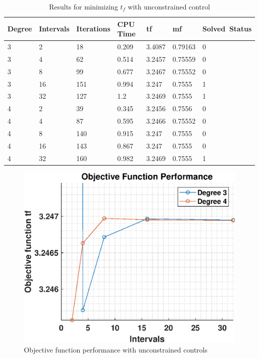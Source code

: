 \documentclass[]{article}
\begin{document}
	\begin{table}[h!]
   	\begin{tabular}{lllllll}
   		Degree & Intervals & Iterations & CPU Time & tf & mf & Solved\ Status \\ 
   		\hline 
   		3 & 2 & 18 & 0.209 & 3.4087 & 0.79163 & 0 \\ 
   		3 & 4 & 62 & 0.514 & 3.2457 & 0.75559 & 0 \\ 
   		3 & 8 & 99 & 0.677 & 3.2467 & 0.75552 & 0 \\ 
   		3 & 16 & 151 & 0.994 & 3.247 & 0.7555 & 1 \\ 
   		3 & 32 & 127 & 1.2 & 3.2469 & 0.7555 & 1 \\ 
   		4 & 2 & 39 & 0.345 & 3.2456 & 0.7556 & 0 \\ 
   		4 & 4 & 87 & 0.595 & 3.2466 & 0.75552 & 0 \\ 
   		4 & 8 & 140 & 0.915 & 3.247 & 0.7555 & 0 \\ 
   		4 & 16 & 143 & 0.867 & 3.247 & 0.7555 & 0 \\ 
   		4 & 32 & 160 & 0.982 & 3.2469 & 0.7555 & 1 \\ 
   		\hline 
   	\end{tabular}
   	\caption{Results for minimizing \(t_f\) with unconstrained control}
   	\label{table:1}
   \end{table}
    \begin{figure}
	  	\centering
	  	\includegraphics[scale=0.75]{obj_c2_tf.eps}
	  	\caption{Objective function performance with unconstrained controls}
	  	\label{fig:obj_c2_tf}
    \end{figure}
\end{document}
